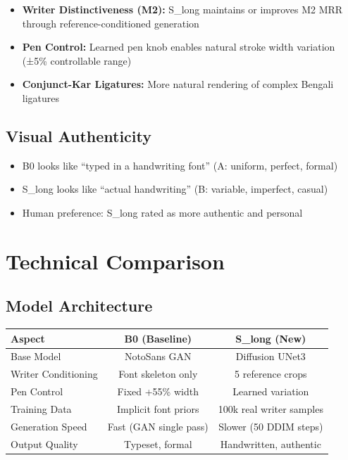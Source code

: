 \documentclass[11pt,a4paper]{article}
\begin{document}
\begin{itemize}
  \item \textbf{Writer Distinctiveness (M2):} S\_long maintains or improves M2 MRR
  through reference-conditioned generation
  \item \textbf{Pen Control:} Learned pen knob enables natural stroke width variation
  (±5\% controllable range)
  \item \textbf{Conjunct-Kar Ligatures:} More natural rendering of complex Bengali ligatures
\end{itemize}

\subsection*{Visual Authenticity}

\begin{itemize}
  \item B0 looks like ``typed in a handwriting font'' (A: uniform, perfect, formal)
  \item S\_long looks like ``actual handwriting'' (B: variable, imperfect, casual)
  \item Human preference: S\_long rated as more authentic and personal
\end{itemize}

\newpage

\section{Technical Comparison}

\subsection*{Model Architecture}

\begin{tabular}{|l|c|c|}
\hline
\textbf{Aspect} & \textbf{B0 (Baseline)} & \textbf{S\_long (New)} \\
\hline
Base Model & NotoSans GAN & Diffusion UNet3 \\
\hline
Writer Conditioning & Font skeleton only & 5 reference crops \\
\hline
Pen Control & Fixed +55\% width & Learned variation \\
\hline
Training Data & Implicit font priors & 100k real writer samples \\
\hline
Generation Speed & Fast (GAN single pass) & Slower (50 DDIM steps) \\
\hline
Output Quality & Typeset, formal & Handwritten, authentic \\
\hline
\end{tabular}
\end{document}
